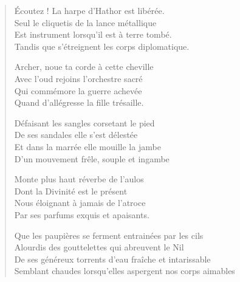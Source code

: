 \begin{verse}
Écoutez ! La harpe d’Hathor est libérée.\\
Seul le cliquetis de la lance métallique\\
Est instrument lorsqu’il est à terre tombé.\\
Tandis que s’étreignent les corps diplomatique.

Archer, noue ta corde à cette cheville\\
Avec l’oud rejoins l’orchestre sacré\\
Qui commémore la guerre achevée\\
Quand d’allégresse la fille trésaille.

Défaisant les sangles corsetant le pied\\
De ses sandales elle s’est délestée\\
Et dans la marrée elle mouille la jambe\\
D’un mouvement frêle, souple et ingambe

Monte plus haut réverbe de l’aulos\\
Dont la Divinité est le présent\\
Nous éloignant à jamais de l’atroce\\
Par ses parfums exquis et apaisants.

Que les paupières se ferment entrainées par les cils\\
Alourdis des gouttelettes qui abreuvent le Nil\\
De ses généreux torrents d’eau fraîche et intarissable\\
Semblant chaudes lorsqu’elles aspergent nos corps aimables
\end{verse}
